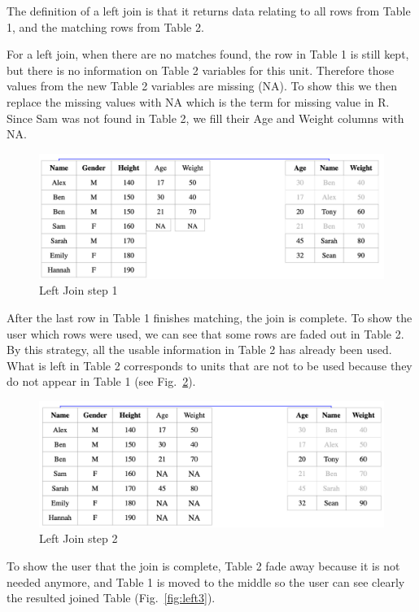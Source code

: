 The definition of a left join is that it returns  data relating to all rows from Table 1, and the matching rows from Table 2. 

For a left join, when there are no matches found, the row in Table 1 is still kept, but there is no information on Table 2 variables for this unit. Therefore those values from the new Table 2 variables are missing (NA).
To show this we then replace the missing values with NA which is the term for missing value in R. Since Sam was not found in Table 2, we fill their Age and Weight columns with NA.

\begin{figure}[H]
    \includegraphics[scale = 0.25]{Masters-Thesis/img/left1.png}
    \caption{Left Join step 1}
    \label{fig:left1}
\end{figure}

After the last row in Table 1 finishes matching, the join is complete. To show the user which rows were used, we can see that some rows are faded out in Table 2. By this strategy, all the usable information in Table 2 has already been used. What is left in Table 2 corresponds to units that are not to be used because they do not appear in Table 1 (see Fig.~\ref{fig:left2}).

\begin{figure}[H]
    \centering
    \includegraphics[scale = 0.25]{Masters-Thesis/img/left2.png}
    \caption{Left Join step 2}
    \label{fig:left2}
\end{figure}

To show the user that the join is complete, Table 2 fade away because it is not needed anymore, and Table 1 is moved to the middle so the user can see clearly the resulted joined Table (Fig.~\ref{fig:left3}). 

